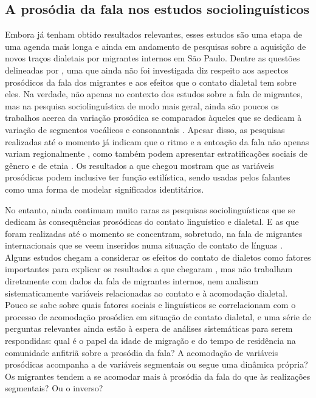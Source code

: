 \documentclass[
	a4paper,	%
	12pt,		%
	]{article}	%
\begin{document}
\subsection{A prosódia da fala nos estudos sociolinguísticos}
\label{prosodia-socio}

Embora já tenham obtido resultados relevantes, esses estudos são uma etapa
de uma agenda mais longa e ainda em andamento de pesquisas sobre a aquisição
de novos traços dialetais por migrantes internos em São Paulo. Dentre as
questões delineadas por \citet{Oushiro2018}, uma que ainda não foi
investigada diz respeito aos aspectos prosódicos da fala dos migrantes e aos
efeitos que o contato dialetal tem sobre eles. Na verdade, não apenas no
contexto dos estudos sobre a fala de migrantes, mas na pesquisa
sociolinguística de modo mais geral, ainda são poucos os trabalhos acerca da
variação prosódica se comparados àqueles que se dedicam à variação de
segmentos vocálicos e consonantais \citep{Thomas2013, Hay.Drager2007}.
Apesar disso, as pesquisas realizadas até o momento já indicam que o ritmo e
a entoação da fala não apenas variam regionalmente
\citep{Clopper.Smiljanic2015, Grabe.etal2000}, como também podem apresentar
estratificações sociais de gênero \citep{Lowry2011} e de etnia
\citep{Thomas2013, Szakay2006}.  Os resultados a que \citet{Podesva2011}
chegou mostram que as variáveis prosódicas podem inclusive ter função
estilística, sendo usadas pelos falantes como uma forma de modelar
significados identitários.

No entanto, ainda continuam muito raras as pesquisas sociolinguísticas que
se dedicam às consequências prosódicas do contato linguístico e dialetal. E
as que foram realizadas até o momento se concentram, sobretudo, na fala de
migrantes internacionais que se veem inseridos numa situação de contato de
línguas \citep{Carter2005}. Alguns estudos chegam a considerar os efeitos do
contato de dialetos como fatores importantes para explicar os resultados a que
chegaram \citep{Torgersen.Szakay2012, Fagyal2010}, mas não trabalham
diretamente com dados da fala de migrantes internos, nem analisam
sistematicamente variáveis relacionadas ao contato e à acomodação dialetal.
Pouco se sabe sobre quais fatores sociais e linguísticos se correlacionam
com o processo de acomodação prosódica em situação de contato dialetal, e
uma série de perguntas relevantes ainda estão à espera de análises
sistemáticas para serem respondidas: qual é o papel da idade de migração e
do tempo de residência na comunidade anfitriã sobre a prosódia da fala? A
acomodação de variáveis prosódicas acompanha a de variáveis segmentais ou
segue uma dinâmica própria? Os migrantes tendem a se acomodar mais à
prosódia da fala do que às realizações segmentais? Ou o inverso? 
		
\end{document}
